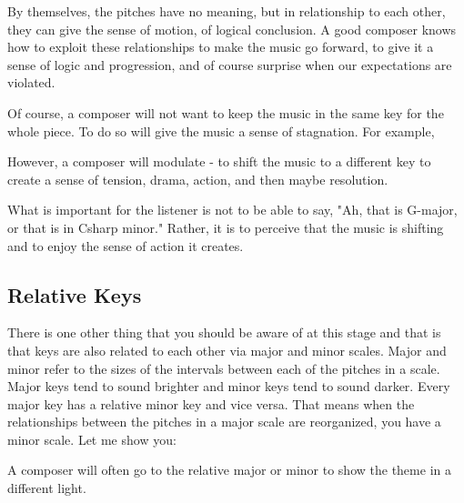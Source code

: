 By themselves, the pitches have no meaning, but in relationship to each other, they can give the sense of motion, of logical conclusion. A good composer knows how to exploit these relationships to make the music go forward, to give it a sense of logic and progression, and of course surprise when our expectations are violated.

Of course, a composer will not want to keep the music in the same key for the whole piece. To do so will give the music a sense of stagnation. For example, 

However, a composer will modulate - to shift the music to a different key to create a sense of tension, drama, action, and then maybe resolution.

What is important for the listener is not to be able to say, "Ah, that is G-major, or that is in Csharp minor." Rather, it is to perceive that the music is shifting and to enjoy the sense of action it creates.

\subsection{Relative Keys}
There is one other thing that you should be aware of at this stage and that is that keys are also related to each other via major and minor scales. Major and minor refer to the sizes of the intervals between each of the pitches in a scale. Major keys tend to sound brighter and minor keys tend to sound darker. Every major key has a relative minor key and vice versa. That means when the relationships between the pitches in a major scale are reorganized, you have a minor scale. Let me show you:


A composer will often go to the relative major or minor to show the theme in a different light.
